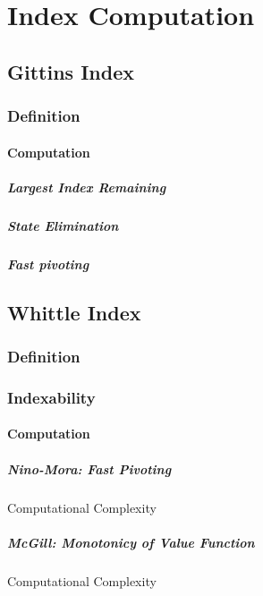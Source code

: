 \chapter{Index Computation}
\label{ch:mab_problem}

\section{Gittins Index}
\label{sec:rested_mab_pb}

\subsection{Definition}
\label{subsec:gittins_idx}

\subsubsection{Computation}

\paragraph{Largest Index Remaining}

\paragraph{State Elimination}

\paragraph{Fast pivoting}

\section{Whittle Index}
\label{sec:restless_mab_pb}

\subsection{Definition}
\label{subsec:whittle_idx}

\subsection{Indexability}

\subsubsection{Computation}

\paragraph{Nino-Mora: Fast Pivoting}

Computational Complexity

\paragraph{McGill: Monotonicy of Value Function}

Computational Complexity

